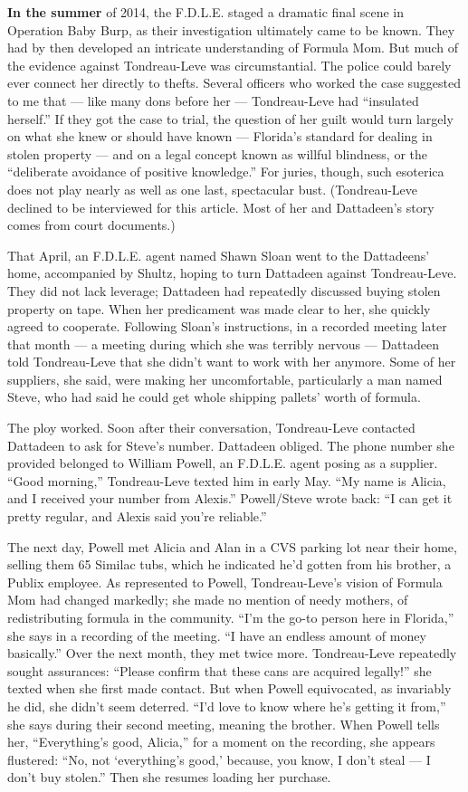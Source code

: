 \textbf{In the summer} of 2014, the F.D.L.E. staged a dramatic final
scene in Operation Baby Burp, as their investigation ultimately came to
be known. They had by then developed an intricate understanding of
Formula Mom. But much of the evidence against Tondreau-Leve was
circumstantial. The police could barely ever connect her directly to
thefts. Several officers who worked the case suggested to me that ---
like many dons before her --- Tondreau-Leve had ``insulated herself.''
If they got the case to trial, the question of her guilt would turn
largely on what she knew or should have known --- Florida's standard for
dealing in stolen property --- and on a legal concept known as willful
blindness, or the ``deliberate avoidance of positive knowledge.'' For
juries, though, such esoterica does not play nearly as well as one last,
spectacular bust. (Tondreau-Leve declined to be interviewed for this
article. Most of her and Dattadeen's story comes from court documents.)

That April, an F.D.L.E. agent named Shawn Sloan went to the Dattadeens'
home, accompanied by Shultz, hoping to turn Dattadeen against
Tondreau-Leve. They did not lack leverage; Dattadeen had repeatedly
discussed buying stolen property on tape. When her predicament was made
clear to her, she quickly agreed to cooperate. Following Sloan's
instructions, in a recorded meeting later that month --- a meeting
during which she was terribly nervous --- Dattadeen told Tondreau-Leve
that she didn't want to work with her anymore. Some of her suppliers,
she said, were making her uncomfortable, particularly a man named Steve,
who had said he could get whole shipping pallets' worth of formula.

The ploy worked. Soon after their conversation, Tondreau-Leve contacted
Dattadeen to ask for Steve's number. Dattadeen obliged. The phone number
she provided belonged to William Powell, an F.D.L.E. agent posing as a
supplier. ``Good morning,'' Tondreau-Leve texted him in early May. ``My
name is Alicia, and I received your number from Alexis.'' Powell/Steve
wrote back: ``I can get it pretty regular, and Alexis said you're
reliable.''

The next day, Powell met Alicia and Alan in a CVS parking lot near their
home, selling them 65 Similac tubs, which he indicated he'd gotten from
his brother, a Publix employee. As represented to Powell,
Tondreau-Leve's vision of Formula Mom had changed markedly; she made no
mention of needy mothers, of redistributing formula in the community.
``I'm the go-to person here in Florida,'' she says in a recording of the
meeting. ``I have an endless amount of money basically.'' Over the next
month, they met twice more. Tondreau-Leve repeatedly sought assurances:
``Please confirm that these cans are acquired legally!'' she texted when
she first made contact. But when Powell equivocated, as invariably he
did, she didn't seem deterred. ``I'd love to know where he's getting it
from,'' she says during their second meeting, meaning the brother. When
Powell tells her, ``Everything's good, Alicia,'' for a moment on the
recording, she appears flustered: ``No, not `everything's good,'
because, you know, I don't steal --- I don't buy stolen.'' Then she
resumes loading her purchase.

